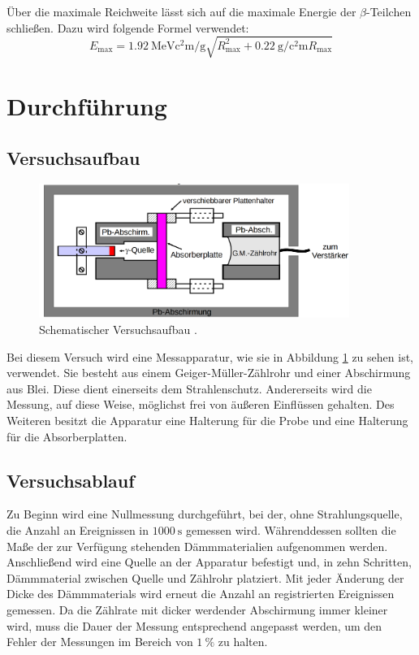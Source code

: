 \documentclass[
  bibliography=totoc,     %
  captions=tableheading,  %
  titlepage=firstiscover, %
]{scrartcl}
\begin{document}
\noindent
Über die maximale Reichweite lässt sich auf die maximale Energie der $\beta$-Teilchen
schließen. Dazu wird folgende Formel verwendet:
\begin{equation}
  E_\mathup{max} = \SI{1.92}{\mega\electronvolt\square\centi\meter\per\gram} \sqrt{R_\mathup{max}^2 + \SI{0.22}{\gram\per\square\centi\meter} R_\mathup{max}}
  \label{eqn:E_max}
\end{equation}


\section{Durchführung}
\label{sec:durchführung}
\subsection{Versuchsaufbau}
\begin{figure}[htb]
  \centering
  \includegraphics[width=0.9\textwidth]{V7043.png}
  \caption{Schematischer Versuchsaufbau \cite{anleitung}.}
  \label{fig:V7043}
\end{figure}
Bei diesem Versuch wird eine Messapparatur, wie sie in Abbildung \ref{fig:V7043}
zu sehen ist, verwendet. Sie besteht aus einem Geiger-Müller-Zählrohr und einer
Abschirmung aus Blei. Diese dient einerseits dem Strahlenschutz. Andererseits
wird die Messung, auf diese Weise, möglichst frei von äußeren Einflüssen gehalten.
Des Weiteren besitzt die Apparatur eine Halterung für die Probe und eine Halterung
für die Absorberplatten.
\subsection{Versuchsablauf}
Zu Beginn wird eine Nullmessung durchgeführt, bei der, ohne Strahlungsquelle,
die Anzahl an Ereignissen in $\SI{1000}{\second}$ gemessen wird.
Währenddessen sollten die Maße der zur Verfügung stehenden Dämmmaterialien
aufgenommen werden. Anschließend wird eine Quelle an der Apparatur befestigt
und, in zehn Schritten, Dämmmaterial zwischen Quelle und Zählrohr platziert.
Mit jeder Änderung der Dicke des Dämmmaterials wird erneut die Anzahl an
registrierten Ereignissen gemessen. Da die Zählrate mit dicker werdender
Abschirmung immer kleiner wird, muss die Dauer der Messung entsprechend
angepasst werden, um den Fehler der Messungen im Bereich von $\SI{1}{\percent}$
zu halten.
\end{document}
